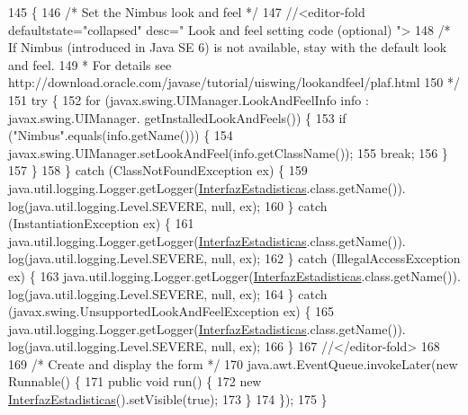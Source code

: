\begin{DoxyCode}
145                                            \{
146         \textcolor{comment}{/* Set the Nimbus look and feel */}
147         \textcolor{comment}{//<editor-fold defaultstate="collapsed" desc=" Look and feel setting code (optional) ">}
148         \textcolor{comment}{/* If Nimbus (introduced in Java SE 6) is not available, stay with the default look and feel.}
149 \textcolor{comment}{         * For details see http://download.oracle.com/javase/tutorial/uiswing/lookandfeel/plaf.html }
150 \textcolor{comment}{         */}
151         \textcolor{keywordflow}{try} \{
152             \textcolor{keywordflow}{for} (javax.swing.UIManager.LookAndFeelInfo info : javax.swing.UIManager.
      getInstalledLookAndFeels()) \{
153                 \textcolor{keywordflow}{if} (\textcolor{stringliteral}{"Nimbus"}.equals(info.getName())) \{
154                     javax.swing.UIManager.setLookAndFeel(info.getClassName());
155                     \textcolor{keywordflow}{break};
156                 \}
157             \}
158         \} \textcolor{keywordflow}{catch} (ClassNotFoundException ex) \{
159             java.util.logging.Logger.getLogger(\mbox{\hyperlink{classejercicio2_1_1_interfaz_estadisticas_a5d6221be6e64b17456cb3530ba3f7368}{InterfazEstadisticas}}.class.getName()).
      log(java.util.logging.Level.SEVERE, null, ex);
160         \} \textcolor{keywordflow}{catch} (InstantiationException ex) \{
161             java.util.logging.Logger.getLogger(\mbox{\hyperlink{classejercicio2_1_1_interfaz_estadisticas_a5d6221be6e64b17456cb3530ba3f7368}{InterfazEstadisticas}}.class.getName()).
      log(java.util.logging.Level.SEVERE, null, ex);
162         \} \textcolor{keywordflow}{catch} (IllegalAccessException ex) \{
163             java.util.logging.Logger.getLogger(\mbox{\hyperlink{classejercicio2_1_1_interfaz_estadisticas_a5d6221be6e64b17456cb3530ba3f7368}{InterfazEstadisticas}}.class.getName()).
      log(java.util.logging.Level.SEVERE, null, ex);
164         \} \textcolor{keywordflow}{catch} (javax.swing.UnsupportedLookAndFeelException ex) \{
165             java.util.logging.Logger.getLogger(\mbox{\hyperlink{classejercicio2_1_1_interfaz_estadisticas_a5d6221be6e64b17456cb3530ba3f7368}{InterfazEstadisticas}}.class.getName()).
      log(java.util.logging.Level.SEVERE, null, ex);
166         \}
167         \textcolor{comment}{//</editor-fold>}
168 
169         \textcolor{comment}{/* Create and display the form */}
170         java.awt.EventQueue.invokeLater(\textcolor{keyword}{new} Runnable() \{
171             \textcolor{keyword}{public} \textcolor{keywordtype}{void} run() \{
172                 \textcolor{keyword}{new} \mbox{\hyperlink{classejercicio2_1_1_interfaz_estadisticas_a5d6221be6e64b17456cb3530ba3f7368}{InterfazEstadisticas}}().setVisible(\textcolor{keyword}{true});
173             \}
174         \});
175     \}
\end{DoxyCode}
\mbox{\label{classejercicio2_1_1_interfaz_estadisticas_a7cea5027e3bb66ab639fb412c07dd74d}} 
